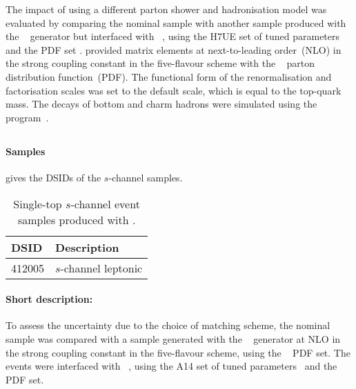 The impact of using a different parton shower and hadronisation model was evaluated by comparing the nominal sample
with another sample produced with the \POWHEGBOX[v2]~\cite{Alioli:2009je,Nason:2004rx,Frixione:2007vw,Alioli:2010xd}
generator but interfaced with \HERWIG[7.04]~\cite{Bahr:2008pv,Bellm:2015jjp}, using the H7UE set of
tuned parameters~\cite{Bellm:2015jjp} and the \MMHT[lo] PDF set \cite{Harland-Lang:2014zoa}.
\POWHEGBOX provided matrix elements at next-to-leading order~(NLO) in the strong coupling constant \alphas
in the five-flavour scheme with the \NNPDF[3.0nlo]~\cite{Ball:2014uwa} parton distribution function~(PDF).
The functional form of the renormalisation and factorisation scales was set to the default scale, which is equal to the top-quark mass.
The decays of bottom and charm hadrons were simulated using the \EVTGEN[1.6.0] program~\cite{Lange:2001uf}.


\subsection[MadGraph5\_aMC@NLO+Pythia8]{\MGNLOPY[8]}
\label{subsubsec:schan_aMCP8}

\paragraph{Samples}

 gives the DSIDs of the $s$-channel \MGNLOPY[8] samples.

\begin{table}[htbp]
  \caption{Single-top $s$-channel event samples produced with \MGNLOPY[8].}%
  \label{tab:schan_aMCP8}
  \centering
  \begin{tabular}{l l}
    \toprule
    DSID & Description \\
    \midrule
    412005 & $s$-channel leptonic \\
    \bottomrule
  \end{tabular}
\end{table}

\paragraph{Short description:}

To assess the uncertainty due to the choice of matching scheme, the nominal sample was compared with a sample generated
with the \MGNLO[2.6.2]~\cite{Alwall:2014hca} generator at NLO in the strong coupling constant \alphas in the five-flavour scheme, 
using the \NNPDF[3.0nlo]~\cite{Ball:2014uwa} PDF set.
The events were interfaced with \PYTHIA[8.230]~\cite{Sjostrand:2014zea}, using the A14 set of tuned parameters~\cite{ATL-PHYS-PUB-2014-021} 
and the \NNPDF[2.3lo] PDF set.


